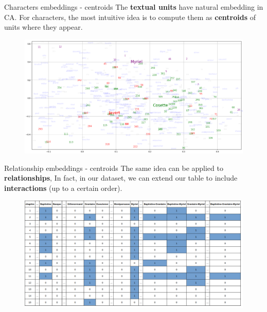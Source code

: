 \documentclass[10pt]{beamer}
\newcommand{\imp}[1]{\textbf{\color{cyan}#1}}
\begin{document}
	
	\begin{frame}{Characters embeddings - centroids}
		The \imp{textual units} have natural embedding in CA. For characters, the most intuitive idea is to compute them as \imp{centroids} of units where they appear.
		\begin{figure}
			\centering
			\includegraphics[width=\textwidth]{img/char_embeddings.png}
		\end{figure}
	\end{frame}
	
	
	\begin{frame}{Relationship embeddings - centroids}
		The same idea can be applied to \imp{relationships}, In fact, in our dataset, we can extend our table to include \imp{interactions} (up to a certain order).
		\begin{figure}
			\centering
			\includegraphics[width=\textwidth]{img/occurences_data.png}
		\end{figure}
	\end{frame}
	
\end{document}
